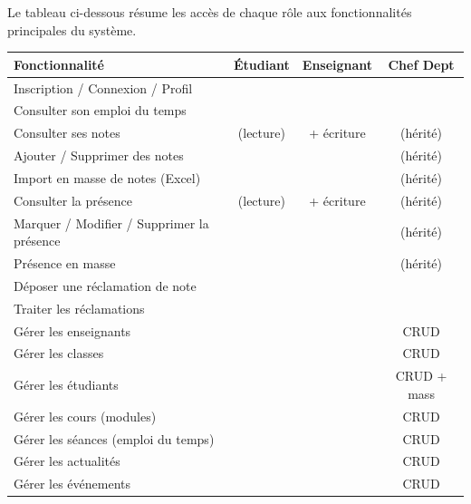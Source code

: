 \documentclass[12pt,a4paper]{article}
\newcommand{\cmark}{\textcolor{teacherGreen}{\ding{51}}}
\newcommand{\xmark}{\textcolor{red}{\ding{55}}}
\begin{document}
Le tableau ci-dessous résume les accès de chaque rôle aux fonctionnalités principales du système.

\vspace{0.5cm}

\begin{center}
\small
\begin{tabular}{>{\raggedright\arraybackslash}p{5.5cm}ccc}
  \toprule
  \textbf{Fonctionnalité} & \textbf{Étudiant} & \textbf{Enseignant} & \textbf{Chef Dept} \\
  \midrule
  Inscription / Connexion / Profil & \cmark & \cmark & \cmark \\
  Consulter son emploi du temps & \cmark & \cmark & \cmark \\
  Consulter ses notes & \cmark\; \footnotesize{(lecture)} & \cmark\; \footnotesize{+ écriture} & \cmark\; \footnotesize{(hérité)} \\
  Ajouter / Supprimer des notes & \xmark & \cmark & \cmark\; \footnotesize{(hérité)} \\
  Import en masse de notes (Excel) & \xmark & \cmark & \cmark\; \footnotesize{(hérité)} \\
  Consulter la présence & \cmark\; \footnotesize{(lecture)} & \cmark\; \footnotesize{+ écriture} & \cmark\; \footnotesize{(hérité)} \\
  Marquer / Modifier / Supprimer la présence & \xmark & \cmark & \cmark\; \footnotesize{(hérité)} \\
  Présence en masse & \xmark & \cmark & \cmark\; \footnotesize{(hérité)} \\
  Déposer une réclamation de note & \cmark & \xmark & \xmark \\
  Traiter les réclamations & \xmark & \xmark & \cmark \\
  Gérer les enseignants & \xmark & \xmark & \cmark\; \footnotesize{CRUD} \\
  Gérer les classes & \xmark & \xmark & \cmark\; \footnotesize{CRUD} \\
  Gérer les étudiants & \xmark & \xmark & \cmark\; \footnotesize{CRUD + mass} \\
  Gérer les cours (modules) & \xmark & \xmark & \cmark\; \footnotesize{CRUD} \\
  Gérer les séances (emploi du temps) & \xmark & \xmark & \cmark\; \footnotesize{CRUD} \\
  Gérer les actualités & \xmark & \xmark & \cmark\; \footnotesize{CRUD} \\
  Gérer les événements & \xmark & \xmark & \cmark\; \footnotesize{CRUD} \\

\end{tabular}
\end{center}
\end{document}
